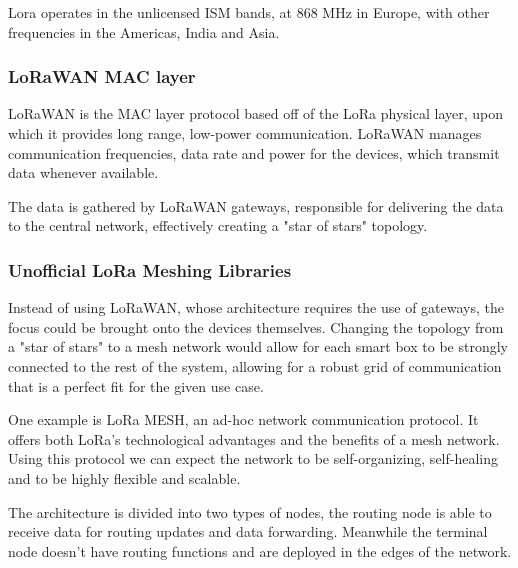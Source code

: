 \documentclass[11pt]{article}
\begin{document}
Lora operates in the unlicensed ISM bands, at 868 MHz in Europe, with other frequencies in the Americas, India and Asia. \par \vspace{0.5 cm}

\subsubsection{LoRaWAN MAC layer}

LoRaWAN is the MAC layer protocol based off of the LoRa physical layer, upon which it provides long range, low-power communication. LoRaWAN manages communication frequencies, data rate and power for the devices, which transmit data whenever available. \par \vspace{0.5 cm}

The data is gathered by LoRaWAN gateways, responsible for delivering the data to the central network, effectively creating a "star of stars" topology. \par \vspace{0.5 cm} 

\subsubsection{Unofficial LoRa Meshing Libraries}
Instead of using LoRaWAN, whose architecture requires the use of gateways, the focus could be brought onto the devices themselves. Changing the topology from a "star of stars" to a mesh network would allow for each smart box to be strongly connected to the rest of the system, allowing for a robust grid of communication that is a perfect fit for the given use case. \par \vspace{0.5 cm}

One example is LoRa MESH, an ad-hoc network communication protocol. It offers both LoRa's technological advantages and the benefits of a mesh network. Using this protocol we can expect the network to be self-organizing, self-healing and to be highly flexible and scalable. \par \vspace{0.5 cm}

The architecture is divided into two types of nodes, the routing node is able to receive data for routing updates and data forwarding. Meanwhile the terminal node doesn't have routing functions and are deployed in the edges of the network. \par \vspace{0.5 cm}
\end{document}
